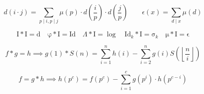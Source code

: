 {
\fontsize{10}{10}\selectfont
$$
d(i \cdot j) = \sum_{p \mid i, p \mid j} \mu (p) \cdot d (\frac{i}{p}) \cdot d (\frac{j}{p})
\qquad
\epsilon (x) = \sum \limits_{d \mid x} \mu (d)
$$

$$
\mathrm{I} * \mathrm{I} = \mathrm{d}
\quad
\mathrm{\varphi} * \mathrm{I} = \mathrm{Id}
\quad
\Lambda * \mathrm{I} = \log
\quad
\mathrm{Id}_k * \mathrm{I} = \mathrm{\sigma}_k
\quad
\mathrm{\mu} * \mathrm{I} = \mathrm{\epsilon}
$$

$$
f * g = h \implies g(1) * S(n) = \sum_{i = 1}^{n} h(i) - \sum_{i = 2}^{n} g(i) S(\left \lfloor \frac{n}{i} \right \rfloor)
$$

$$
f = g * h \implies h(p ^ c) = f(p ^ c) - \sum_{i = 1}^{c} g(p ^ i) \cdot h(p ^ {c-i})
$$

}
